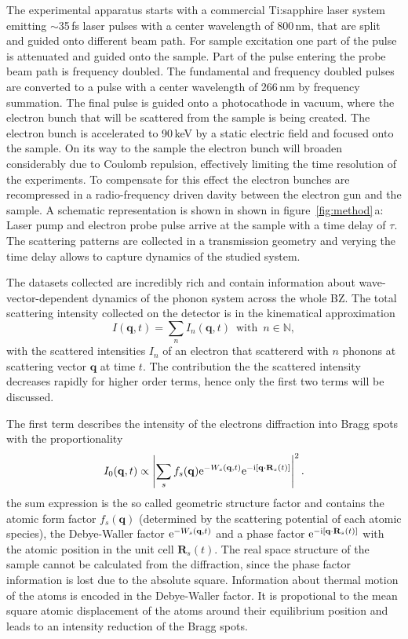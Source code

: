 The experimental apparatus starts with a commercial Ti:sapphire laser system emitting $\sim$35\,fs laser pulses with a center wavelength of 800\,nm, that are split and guided onto different beam path.
For sample excitation one part of the pulse is attenuated and guided onto the sample.
Part of the pulse entering the probe beam path is frequency doubled. The fundamental and frequency doubled pulses are converted to a pulse with a center wavelength of 266\,nm by frequency summation.
The final pulse is guided onto a photocathode in vacuum, where the electron bunch that will be scattered from the sample is being created.
The electron bunch is accelerated to 90\,keV by a static electric field and focused onto the sample.
On its way to the sample the electron bunch will broaden considerably due to Coulomb repulsion, effectively limiting the time resolution of the experiments.
To compensate for this effect the electron bunches are recompressed in a radio-frequency driven davity between the electron gun and the sample.
A schematic representation is shown in shown in figure~\ref{fig:method}\,a:
Laser pump and electron probe pulse arrive at the sample with a time delay of $\tau$.
The scattering patterns are collected in a transmission geometry and verying the time delay allows to capture dynamics of the studied system.

The datasets collected are incredibly rich and contain information about wave-vector-dependent dynamics of the phonon system across the whole \ac{BZ}.
The total scattering intensity collected on the detector is in the kinematical approximation
\[ I(\mathbf{q},t) = \sum_n I_n(\mathbf{q},t)\enspace\text{with}\enspace n \in\mathbb{N},\]
with the scattered intensities $I_n$ of an electron that scattererd with $n$ phonons at scattering vector $\mathbf{q}$ at time $t$.
The contribution the the scattered intensity decreases rapidly for higher order terms, hence only the first two terms will be discussed.

The first term describes the intensity of the electrons diffraction into Bragg spots with the proportionality
\[ I_0(\mathbf{q}, t) \propto \left| \sum_s f_s(\mathbf{q}) \mathrm{e}^{-W_s(\mathbf{q},t)} \mathrm{e}^{-\mathrm{i}[\mathbf{q}\cdot\mathbf{R}_s(t)]} \right| ^2.\]
the sum expression is the so called geometric structure factor and contains the atomic form factor $f_s(\mathbf{q})$ (determined by the scattering potential of each atomic species), the Debye-Waller factor $\mathrm{e}^{-W_s(\mathbf{q},t)}$ and a phase factor $\mathrm{e}^{-\mathrm{i}[\mathbf{q}\cdot\mathbf{R}_s(t)]}$ with the atomic position in the unit cell $\mathbf{R}_s(t)$.
The real space structure of the sample cannot be calculated from the diffraction, since the phase factor information is lost due to the absolute square.
Information about thermal motion of the atoms is encoded in the Debye-Waller factor.
It is propotional to the mean square atomic displacement of the atoms around their equilibrium position and leads to an intensity reduction of the Bragg spots.

